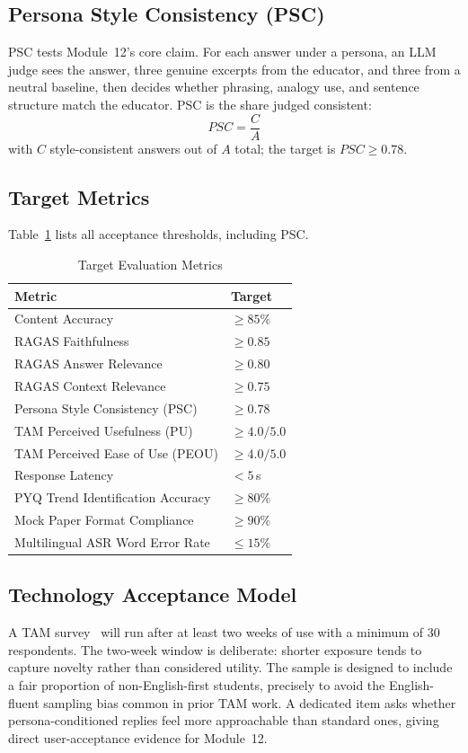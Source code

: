 \documentclass[conference]{IEEEtran}
\begin{document}
\subsection{Persona Style Consistency (PSC)}
PSC tests Module~12's core claim. For each answer under a persona, an
LLM judge sees the answer, three genuine excerpts from the educator, and
three from a neutral baseline, then decides whether phrasing, analogy
use, and sentence structure match the educator. PSC is the share judged
consistent:
\begin{equation}
    PSC = \frac{C}{A}
\end{equation}
with $C$ style-consistent answers out of $A$ total; the target is
$PSC \geq 0.78$.
\subsection{Target Metrics}
Table~\ref{tab:metrics} lists all acceptance thresholds, including PSC.
\begin{table}[htbp]
\caption{Target Evaluation Metrics}
\label{tab:metrics}
\begin{tabular}{ll}
\toprule
\textbf{Metric}                      & \textbf{Target} \\
\midrule
Content Accuracy                     & $\geq 85\%$ \\
RAGAS Faithfulness                   & $\geq 0.85$ \\
RAGAS Answer Relevance               & $\geq 0.80$ \\
RAGAS Context Relevance              & $\geq 0.75$ \\
Persona Style Consistency (PSC)      & $\geq 0.78$ \\
TAM Perceived Usefulness (PU)        & $\geq 4.0/5.0$ \\
TAM Perceived Ease of Use (PEOU)     & $\geq 4.0/5.0$ \\
Response Latency                     & $< 5\,$s \\
PYQ Trend Identification Accuracy    & $\geq 80\%$ \\
Mock Paper Format Compliance         & $\geq 90\%$ \\
Multilingual ASR Word Error Rate     & $\leq 15\%$ \\
\bottomrule
\end{tabular}
\end{table}
\subsection{Technology Acceptance Model}
A TAM survey~\cite{davis1989} will run after at least two weeks of use
with a minimum of 30 respondents. The two-week window is deliberate:
shorter exposure tends to capture novelty rather than considered
utility. The sample is designed to include a fair proportion of
non-English-first students, precisely to avoid the English-fluent
sampling bias common in prior TAM work. A dedicated item asks whether
persona-conditioned replies feel more approachable than standard ones,
giving direct user-acceptance evidence for Module~12.
\end{document}
